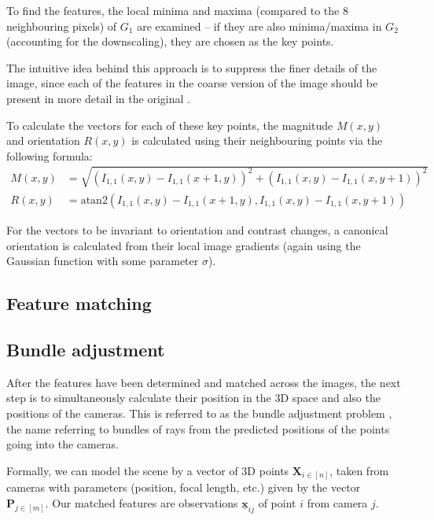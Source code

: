 To find the features, the local minima and maxima (compared to the 8 neighbouring pixels) of $G_1$ are examined -- if they are also minima/maxima in $G_2$ (accounting for the downscaling), they are chosen as the key points.

The intuitive idea behind this approach is to suppress the finer details of the image, since each of the features in the coarse version of the image should be present in more detail in the original \cite{scalespace}.

To calculate the vectors for each of these key points, the magnitude $M(x,y)$ and orientation $R(x,y)$ is calculated using their neighbouring points via the following formula:
$$
\begin{aligned}
	M(x,y) &= \sqrt{\left(I_{1,1}(x, y) - I_{1,1}(x + 1, y)\right)^2 + \left(I_{1,1}(x,y) - I_{1,1}(x, y + 1)\right)^2} \\[0.7em]
	R(x,y) &= \mathrm{atan2} \left(I_{1,1}(x, y) - I_{1,1}(x + 1, y), I_{1,1}(x,y) - I_{1,1}(x, y + 1)\right)
\end{aligned}
$$

For the vectors to be invariant to orientation and contrast changes, a canonical orientation is calculated from their local image gradients (again using the Gaussian function with some parameter $\sigma$).

\subsection{Feature matching}


\subsection{Bundle adjustment}
After the features have been determined and matched across the images, the next step is to simultaneously calculate their position in the 3D space and also the positions of the cameras.
This is referred to as the bundle adjustment problem \cite{snavely2008modeling,schneider19913}, the name referring to bundles of rays from the predicted positions of the points going into the cameras.

Formally, we can model the scene by a vector of 3D points $\mathbf{X}_{i \in [n]}$, taken from cameras with parameters (position, focal length, etc.) given by the vector $\mathbf{P}_{j \in [m]}$.
Our matched features are observations $\underline{\bm{x}}_{ij}$ of point $i$ from camera $j$.

